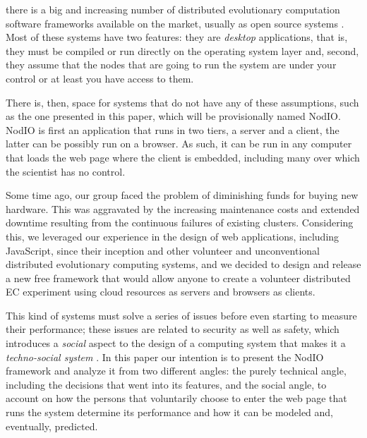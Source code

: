 \documentclass[journal,onecolumn]{IEEEtran}
\begin{document}
 there is a big and increasing number of
distributed evolutionary computation software frameworks available on
the market, usually as open source systems \cite{Parejo12Survey}. Most of these systems have %
two features: they are {\em desktop} applications, that is, they must
be compiled or run directly on the operating system layer and, second,
they assume that the nodes that are going to run the system are under
your control or at least you have access to them.

There is, then, space for systems that do not have any of these
assumptions, such as the one presented in this paper, which will be
provisionally named {\sf NodIO}. {\sf NodIO} is first an application that
runs in two tiers, a server and a client, the latter  can be possibly
run on a  %
browser. As such, it can be run in any computer that loads the web
page where the client is embedded, including many over which%
the scientist has no control.

Some time ago, our group faced the problem of diminishing funds for
buying new     %
hardware. This was aggravated by the increasing maintenance costs and
extended downtime resulting from the continuous failures of existing
clusters.
Considering this, we leveraged our experience in the design of web
applications, including JavaScript, since their inception and other
volunteer and
unconventional distributed evolutionary computing systems, and we
decided to design and release a new free framework that would allow anyone to
create a volunteer distributed EC experiment using cloud resources as
servers and browsers as clients.

This kind of systems must solve a series of issues before even starting to %
measure their performance; these issues are related to security as well as
safety, which introduces a {\em social} aspect to the design of a
computing system that makes it a {\em techno-social system}
\cite{vespignani2009predicting}. In this paper our intention is to
present the {\sf NodIO} framework and analyze it from two different
angles: the purely technical angle, including the decisions that went
into its features, and the social angle, to account on how the persons
that voluntarily choose to enter the web page that runs the system
determine its performance and how it can be modeled and, eventually,
predicted.
\end{document}
